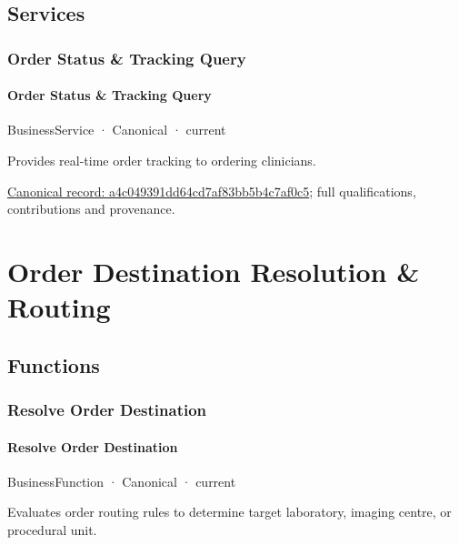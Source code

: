 \subsection{Services}

\subsubsection{Order Status \& Tracking Query}

\paragraph{Order Status \& Tracking Query}

\label{element:a4c049391dd64cd7af83bb5b4c7af0c5}
{\small BusinessService · Canonical · current}\par

Provides real-time order tracking to ordering clinicians.


{\footnotesize \href{../../../../continuum/business/business-service/a4c049391dd64cd7af83bb5b4c7af0c5.md}{Canonical record: a4c049391dd64cd7af83bb5b4c7af0c5}; full qualifications, contributions and provenance.}\par
\section{Order Destination Resolution \& Routing}

\subsection{Functions}

\subsubsection{Resolve Order Destination}

\paragraph{Resolve Order Destination}

\label{element:5e21ed48205446a9b05bc8017d1eccfc}
{\small BusinessFunction · Canonical · current}\par

Evaluates order routing rules to determine target laboratory, imaging centre, or procedural unit.


